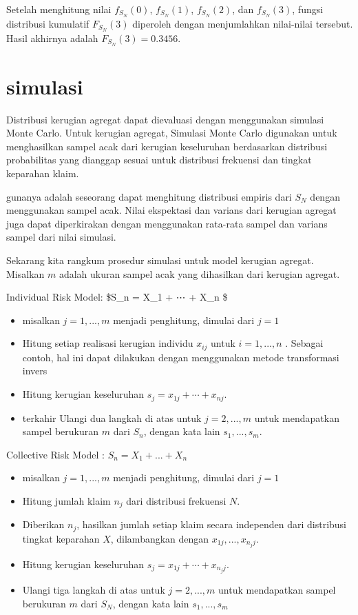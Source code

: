 \documentclass[
]{book}
\providecommand{\tightlist}{%
  \setlength{\itemsep}{0pt}\setlength{\parskip}{0pt}}
\begin{document}
Setelah menghitung nilai \(f_{S_N}(0)\), \(f_{S_N}(1)\), \(f_{S_N}(2)\), dan \(f_{S_N}(3)\), fungsi distribusi kumulatif \(F_{S_N}(3)\) diperoleh dengan menjumlahkan nilai-nilai tersebut. Hasil akhirnya adalah \(F_{S_N}(3) = 0.3456\).

\hypertarget{simulasi}{%
\section{simulasi}\label{simulasi}}

Distribusi kerugian agregat dapat dievaluasi dengan menggunakan simulasi Monte Carlo. Untuk kerugian agregat, Simulasi Monte Carlo digunakan untuk menghasilkan sampel acak dari kerugian keseluruhan berdasarkan distribusi probabilitas yang dianggap sesuai untuk distribusi frekuensi dan tingkat keparahan klaim.

gunanya adalah seseorang dapat menghitung distribusi empiris dari \(S_N\) dengan menggunakan sampel acak. Nilai ekspektasi dan varians dari kerugian agregat juga dapat diperkirakan dengan menggunakan rata-rata sampel dan varians sampel dari nilai simulasi.

Sekarang kita rangkum prosedur simulasi untuk model kerugian agregat. Misalkan \(m\) adalah ukuran sampel acak yang dihasilkan dari kerugian agregat.

Individual Risk Model: \$S\_n = X\_1 + ⋯ + X\_n \$

\begin{itemize}
\tightlist
\item
  misalkan \(j=1,...,m\) menjadi penghitung, dimulai dari \(j = 1\)
\item
  Hitung setiap realisasi kerugian individu \(x_{ij}\) untuk \(i=1,...,n\) . Sebagai contoh, hal ini dapat dilakukan dengan menggunakan metode transformasi invers
\item
  Hitung kerugian keseluruhan \(s_j = x_{1j} + ⋯ + x_{nj}\).
\item
  terkahir Ulangi dua langkah di atas untuk \(j=2,...,m\) untuk mendapatkan sampel berukuran \(m\) dari \(S_n\), dengan kata lain \({s_1,...,s_m}\).
\end{itemize}

Collective Risk Model : \(S_n = X_1 + ... + X_n\)

\begin{itemize}
\tightlist
\item
  misalkan \(j=1,...,m\) menjadi penghitung, dimulai dari \(j = 1\)
\item
  Hitung jumlah klaim \(n_j\) dari distribusi frekuensi \(N\).
\item
  Diberikan \(n_j\), hasilkan jumlah setiap klaim secara independen dari distribusi tingkat keparahan \(X\), dilambangkan dengan \(x_{1j},...,x_{{n_j}j}\).
\item
  Hitung kerugian keseluruhan \(s_j = x_{1j} + ⋯ + x_{{n_j}j}\).
\item
  Ulangi tiga langkah di atas untuk \(j=2,...,m\) untuk mendapatkan sampel berukuran \(m\) dari \(S_N\), dengan kata lain \({s_1,...,s_m}\)
\end{itemize}
\end{document}
